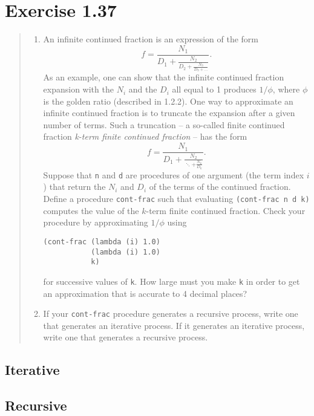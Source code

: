 \documentclass{article}
\begin{document}
\section{Exercise 1.37}
\begin{quote}
    \begin{enumerate}
        \item An infinite continued fraction is an expression of the form
            \begin{equation*}
                f=\frac{N_1}{D_1+\frac{N_2}{D_2+\frac{N_3}{D_3+\ldots}}}.
            \end{equation*}
            As an example, one can show that the infinite continued fraction
            expansion with the $N_i$ and the $D_i$ all equal to 1 produces
            $1/\phi$, where $\phi$ is the golden ratio (described in 1.2.2).
            One way to approximate an infinite continued fraction is to
            truncate the expansion after a given number of terms. Such a
            truncation -- a so-called finite continued fraction
            \emph{k-term finite continued fraction} -- has the form
            \begin{equation*}
                f=\frac{N_1}{D_1+\frac{N_2}{\ddots+\frac{N_k}{D_k}}}.
            \end{equation*}
            Suppose that \texttt{n} and \texttt{d} are procedures of one
            argument (the term index $i$) that return the $N_i$ and $D_i$ of
            the terms of the continued fraction. Define a procedure
            \texttt{cont-frac} such that evaluating \texttt{(cont-frac n d k)}
            computes the value of the $k$-term finite continued fraction. Check
            your procedure by approximating $1/\phi$ using
            \begin{lstlisting}
(cont-frac (lambda (i) 1.0)
           (lambda (i) 1.0)
           k)
            \end{lstlisting}
            for successive values of \texttt{k}. How large must you make
            \texttt{k} in order to get an approximation that is accurate to 4
            decimal places?
        \item If your \texttt{cont-frac} procedure generates a recursive
            process, write one that generates an iterative process. If it
            generates an iterative process, write one that generates a
            recursive process.
    \end{enumerate}
\end{quote}

\subsection{Iterative}


\subsection{Recursive}

\end{document}
